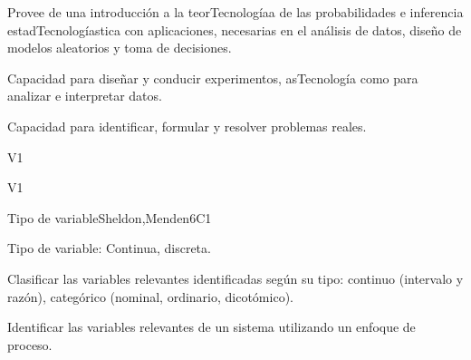 
\begin{syllabus}


\begin{justification}
Provee de una introducción a la teorTecnologíaa de las probabilidades e inferencia estadTecnologíastica con aplicaciones, necesarias en el análisis de datos, diseño de modelos aleatorios y toma de decisiones.
\end{justification}

\begin{goals}
\item Capacidad para diseñar y conducir experimentos, asTecnología como para analizar e interpretar datos.
\item Capacidad para identificar, formular y resolver problemas reales.
\end{goals}

\begin{outcomes}{V1}
   \item {}
   \item {}
\end{outcomes}

\begin{competences}{V1}
    \item {} 
    \item {}
\end{competences}


\begin{unit}{Tipo de variable}{}{Sheldon,Menden}{6}{C1}
\begin{topics}
      \item Tipo de variable: Continua, discreta.
   \end{topics}

   \begin{learningoutcomes}
      \item Clasificar las variables relevantes identificadas según su tipo: continuo (intervalo y razón), categórico (nominal, ordinario, dicotómico).
      \item Identificar las variables relevantes de un sistema utilizando un enfoque de proceso.
   \end{learningoutcomes}
\end{unit}


\end{syllabus}
